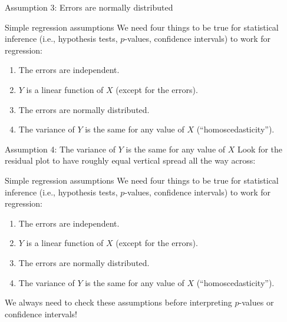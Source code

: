 \documentclass{beamer}\usepackage[]{graphicx}\usepackage[]{color}
\newenvironment{knitrout}{}{} %
\begin{document}
\begin{darkframes}
\begin{frame}[fragile]{Assumption 3: Errors are normally distributed}
\begin{knitrout}
\end{knitrout}
    \end{frame}

    \begin{frame}{Simple regression assumptions}
      We need four things to be true for statistical inference (i.e., hypothesis tests, $p$-values, confidence intervals) to work for regression:
      \begin{enumerate}
        \item The errors are independent. \greencheckmark
        \item $Y$ is a linear function of $X$ (except for the errors). \greencheckmark
        \item The errors are normally distributed. \greencheckmark
        \item The variance of $Y$ is the same for any value of $X$ (``homoscedasticity'').
      \end{enumerate}
    \end{frame}

    \begin{frame}[fragile]{Assumption 4: The variance of $Y$ is the same for any value of $X$}
      Look for the residual plot to have roughly equal vertical spread all the way across:
\begin{knitrout}


\end{knitrout}
    \end{frame}

    \begin{frame}{Simple regression assumptions}
      We need four things to be true for statistical inference (i.e., hypothesis tests, $p$-values, confidence intervals) to work for regression:
      \begin{enumerate}
        \item The errors are independent. \greencheckmark
        \item $Y$ is a linear function of $X$ (except for the errors). \greencheckmark
        \item The errors are normally distributed. \greencheckmark
        \item The variance of $Y$ is the same for any value of $X$ (``homoscedasticity''). \greencheckmark
      \end{enumerate}
      \pause
      \alert{We always need to check these assumptions before interpreting $p$-values or confidence intervals!}
      \lc
    \end{frame}


\end{darkframes}
\end{document}
